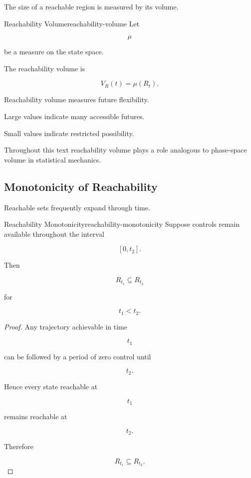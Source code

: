 \documentclass[12pt,twoside,openright]{book}
\newenvironment{rem}
{\begin{remark}{}{}}
{\end{remark}}
\begin{document}
The size of a reachable region is measured by its volume.

\begin{definition}{Reachability Volume}{reachability-volume}
Let

\[
\mu
\]

be a measure on the state space.

The reachability volume is

\[
V_R(t)
=

\mu(R_t).
\]
\end{definition}

Reachability volume measures future flexibility.

Large values indicate many accessible futures.

Small values indicate restricted possibility.

\begin{rem}
Throughout this text reachability volume plays a role
analogous to phase-space volume in statistical mechanics.
\end{rem}

\subsection{Monotonicity of Reachability}

Reachable sets frequently expand through time.

\begin{theorem}{Reachability Monotonicity}{reachability-monotonicity}
Suppose controls remain available throughout the interval

\[
[0,t_2].
\]

Then

\[
R_{t_1}
\subseteq
R_{t_2}
\]

for

\[
t_1<t_2.
\]
\end{theorem}

\begin{proof}
Any trajectory achievable in time

\[
t_1
\]

can be followed by a period of zero control until

\[
t_2.
\]

Hence every state reachable at

\[
t_1
\]

remains reachable at

\[
t_2.
\]

Therefore

\[
R_{t_1}
\subseteq
R_{t_2}.
\]
\end{proof}
\end{document}
